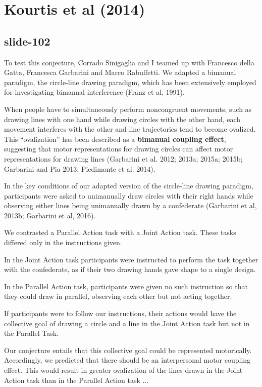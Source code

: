 \documentclass[12pt,\papersize]{extarticle}
\begin{document}
\section{Kourtis et al (2014)}

\subsection{slide-102}
To test this conjecture, Corrado Sinigaglia and I teamed up with
Francesco della Gatta, Francesca Garbarini and Marco Rabuffetti.
We adapted a bimanual paradigm, the circle-line drawing paradigm, which has been
extensively employed for investigating bimanual interference (Franz et al, 1991).

When people have to simultaneously perform noncongruent movements,
such as drawing lines with one hand while drawing circles with the
other hand, each movement interferes with the other and line trajectories
tend to become ovalized. This “ovalization” has been described as a \textbf{bimanual coupling effect},
suggesting that motor representations for drawing circles can affect motor representations
for drawing lines (Garbarini et al. 2012; 2013a; 2015a; 2015b; Garbarini and Pia 2013;
Piedimonte et al. 2014).

In the key conditions of our adapted version of the circle-line drawing paradigm,
participants were asked to unimanually draw circles with their right hands
while observing either lines being unimanually drawn by a confederate (Garbarini et al, 2013b;
Garbarini et al, 2016).

We contrasted a Parallel Action task with a Joint Action task.
These tasks differed only in the instructions given.

In the Joint Action task participants were instructed to perform the task
together with the confederate, as if their two drawing hands gave shape to a single design.

In the Parallel Action task, participants were given no such instruction so that
they could draw in parallel, observing each other but not acting together.

If participants were to follow our instructions, their actions would have
the collective goal of drawing a circle and a line in the Joint Action task but not in
the Parallel Task.

Our conjecture entails that this collective goal could be represented motorically.
Accordingly, we predicted that there should be an interpersonal motor coupling effect.
This would result in greater ovalization of the lines drawn in the Joint Action task
than in the Parallel Action task ...
\end{document}

